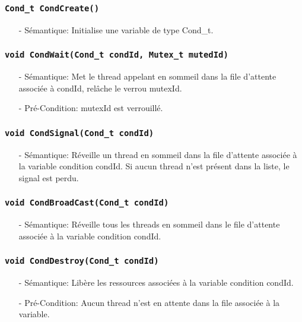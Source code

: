 \documentclass[11pt]{article}
\begin{document}
\subsubsection{\texttt{Cond\_t CondCreate()}}
\begin{itemize}
\item[-]Sémantique: Initialise une variable de type Cond\_t.
\end{itemize}

\subsubsection{\texttt{void CondWait(Cond\_t condId, Mutex\_t mutedId)}}
\begin{itemize}
\item[-]Sémantique: Met le thread appelant en sommeil dans la file d'attente associée à condId,
  relâche le verrou mutexId.
\item[-]Pré-Condition: mutexId est verrouillé.
\end{itemize}

\subsubsection{\texttt{void CondSignal(Cond\_t condId)}}
\begin{itemize}
\item[-]Sémantique: Réveille un thread en sommeil dans la file d'attente associée à la variable
  condition condId. Si aucun thread n'est présent dans la liste, le signal est perdu.
\end{itemize}

\subsubsection{\texttt{void CondBroadCast(Cond\_t condId)}}
\begin{itemize}
\item[-]Sémantique: Réveille tous les threads en sommeil dans le file d'attente associée à la variable
  condition condId.
\end{itemize}

\subsubsection{\texttt{void CondDestroy(Cond\_t condId)}}
\begin{itemize}
\item[-]Sémantique: Libère les ressources associées à la variable condition condId. 
\item[-]Pré-Condition: Aucun thread n'est en attente dans la file associée à la variable.
\end{itemize}
\end{document}
